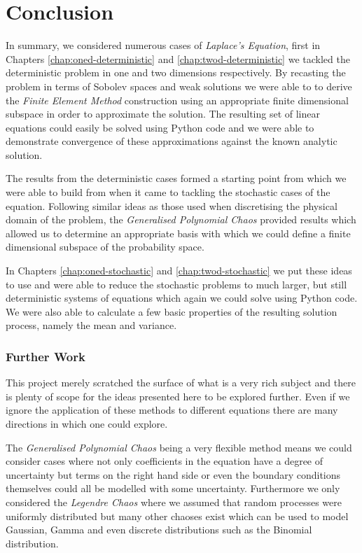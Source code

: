 \chapter{Conclusion}

In summary, we considered numerous cases of \textit{Laplace's Equation}, first
in Chapters \ref{chap:oned-deterministic} and \ref{chap:twod-deterministic} we
tackled the deterministic problem in one and two dimensions respectively. By
recasting the problem in terms of Sobolev spaces and weak solutions we were
able to to derive the \textit{Finite Element Method} construction using an
appropriate finite dimensional subspace in order to approximate the solution.
The resulting set of linear equations could easily be solved using Python code
and we were able to demonstrate convergence of these approximations against the
known analytic solution.

The results from the deterministic cases formed a starting point from which we
were able to build from when it came to tackling the stochastic cases of the
equation. Following similar ideas as those used when discretising the physical
domain of the problem, the \textit{Generalised Polynomial Chaos} provided
results which allowed us to determine an appropriate basis with which we could
define a finite dimensional subspace of the probability space.

In Chapters \ref{chap:oned-stochastic} and \ref{chap:twod-stochastic} we put
these ideas to use and were able to reduce the stochastic problems to much
larger, but still deterministic systems of equations which again we could solve
using Python code. We were also able to calculate a few basic properties of the
resulting solution process, namely the mean and variance.

\subsection*{Further Work}

This project merely scratched the surface of what is a very rich subject and
there is plenty of scope for the ideas presented here to be explored further.
Even if we ignore the application of these methods to different equations there
are many directions in which one could explore.

The \textit{Generalised Polynomial Chaos} being a very flexible method means we
could consider cases where not only coefficients in the equation have a degree
of uncertainty but terms on the right hand side or even the boundary conditions
themselves could all be modelled with some uncertainty. Furthermore we only
considered the \textit{Legendre Chaos} where we assumed that random processes
were uniformly distributed but many other chaoses exist which can be used to
model Gaussian, Gamma and even discrete distributions such as the Binomial
distribution.

